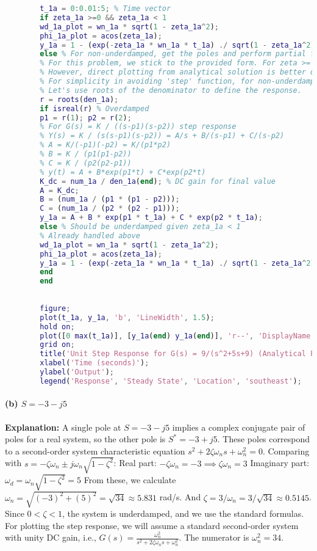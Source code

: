 \documentclass{article}
\begin{document}
\begin{lstlisting}[language=Matlab, caption=MATLAB Code for Problem 1(a) (Using Formulas)]
		% Plotting the analytical unit step response c(t) = 1 - (exp(-zeta*wn*t)/sqrt(1-zeta^2)) * sin(wd*t + phi)
		t_1a = 0:0.01:5; % Time vector
		if zeta_1a >=0 && zeta_1a < 1
		wd_1a_plot = wn_1a * sqrt(1 - zeta_1a^2);
		phi_1a_plot = acos(zeta_1a);
		y_1a = 1 - (exp(-zeta_1a * wn_1a * t_1a) ./ sqrt(1 - zeta_1a^2)) .* sin(wd_1a_plot * t_1a + phi_1a_plot);
		else % For non-underdamped, get the poles and perform partial fraction expansion or numerical integration
		% For this problem, we stick to the provided form. For zeta >= 1, the formula simplifies.
		% However, direct plotting from analytical solution is better done by symbolic/numerical integration for general case.
		% For simplicity in avoiding 'step' function, for non-underdamped, we would have to analytically derive.
		% Let's use roots of the denominator to define the response.
		r = roots(den_1a);
		if isreal(r) % Overdamped
		p1 = r(1); p2 = r(2);
		% For G(s) = K / ((s-p1)(s-p2)) step response
		% Y(s) = K / (s(s-p1)(s-p2)) = A/s + B/(s-p1) + C/(s-p2)
		% A = K/(-p1)(-p2) = K/(p1*p2)
		% B = K / (p1(p1-p2))
		% C = K / (p2(p2-p1))
		% y(t) = A + B*exp(p1*t) + C*exp(p2*t)
		K_dc = num_1a / den_1a(end); % DC gain for final value
		A = K_dc;
		B = (num_1a / (p1 * (p1 - p2)));
		C = (num_1a / (p2 * (p2 - p1)));
		y_1a = A + B * exp(p1 * t_1a) + C * exp(p2 * t_1a);
		else % Should be underdamped given zeta_1a < 1
		% Already handled above
		wd_1a_plot = wn_1a * sqrt(1 - zeta_1a^2);
		phi_1a_plot = acos(zeta_1a);
		y_1a = 1 - (exp(-zeta_1a * wn_1a * t_1a) ./ sqrt(1 - zeta_1a^2)) .* sin(wd_1a_plot * t_1a + phi_1a_plot);
		end
		end
		
		
		figure;
		plot(t_1a, y_1a, 'b', 'LineWidth', 1.5);
		hold on;
		plot([0 max(t_1a)], [y_1a(end) y_1a(end)], 'r--', 'DisplayName', 'Steady State');
		grid on;
		title('Unit Step Response for G(s) = 9/(s^2+5s+9) (Analytical Plot)');
		xlabel('Time (seconds)');
		ylabel('Output');
		legend('Response', 'Steady State', 'Location', 'southeast');
	\end{lstlisting}
	
	\paragraph{(b) $S = -3 - j5$}
	\textbf{Explanation:}
	A single pole at $S = -3 - j5$ implies a complex conjugate pair of poles for a real system, so the other pole is $S^* = -3 + j5$.
	These poles correspond to a second-order system characteristic equation $s^2 + 2\zeta\omega_n s + \omega_n^2 = 0$.
	Comparing with $s = -\zeta\omega_n \pm j\omega_n\sqrt{1-\zeta^2}$:
	Real part: $-\zeta\omega_n = -3 \implies \zeta\omega_n = 3$
	Imaginary part: $\omega_d = \omega_n\sqrt{1-\zeta^2} = 5$
	From these, we calculate $\omega_n = \sqrt{(-3)^2 + (5)^2} = \sqrt{34} \approx 5.831$ rad/s.
	And $\zeta = 3/\omega_n = 3/\sqrt{34} \approx 0.5145$.
	Since $0 < \zeta < 1$, the system is underdamped, and we use the standard formulas.
	For plotting the step response, we will assume a standard second-order system with unity DC gain, i.e., $G(s) = \frac{\omega_n^2}{s^2 + 2\zeta\omega_n s + \omega_n^2}$. The numerator is $\omega_n^2 = 34$.
	
\end{document}
